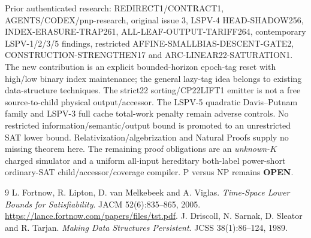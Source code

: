 \documentclass[11pt]{article}
\begin{document}
Prior authenticated research: REDIRECT1/CONTRACT1, AGENTS/CODEX/pnp-research, original issue 3, LSPV-4 HEAD-SHADOW256, INDEX-ERASURE-TRAP261, ALL-LEAF-OUTPUT-TARIFF264, contemporary LSPV-1/2/3/5 findings, restricted AFFINE-SMALLBIAS-DESCENT-GATE2, CONSTRUCTION-STRENGTHEN17 and ARC-LINEAR22-SATURATION1. The new contribution is an explicit bounded-horizon epoch-tag reset with high/low binary index maintenance; the general lazy-tag idea belongs to existing data-structure techniques. The strict22 sorting/CP22LIFT1 emitter is not a free source-to-child physical output/accessor. The LSPV-5 quadratic Davis--Putnam family and LSPV-3 full cache total-work penalty remain adverse controls. No restricted information/semantic/output bound is promoted to an unrestricted SAT lower bound. Relativization/algebrization and Natural Proofs supply no missing theorem here. The remaining proof obligations are an \emph{unknown-$K$} charged simulator and a uniform all-input hereditary both-label power-short ordinary-SAT child/accessor/coverage compiler. P versus NP remains \textbf{OPEN}.
\begin{thebibliography}{9}
 L. Fortnow, R. Lipton, D. van Melkebeek and A. Viglas. \emph{Time-Space Lower Bounds for Satisfiability}. JACM 52(6):835--865, 2005. \url{https://lance.fortnow.com/papers/files/tst.pdf}.
 J. Driscoll, N. Sarnak, D. Sleator and R. Tarjan. \emph{Making Data Structures Persistent}. JCSS 38(1):86--124, 1989.
\end{thebibliography}
\end{document}
